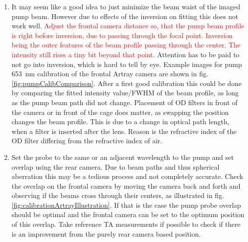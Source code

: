 \documentclass[twoside,openright]{scrreprt}
\begin{document}
\begin{enumerate}
\item It may seem like a good idea to just minimize the beam waist of the imaged pump beam. However due to effects of the inversion on fitting this does not work well. \textcolor{red}{Adjust the frontal camera distance so, that the pump beam profile is right before inversion, due to passing through the focal point. Inversion being the outer features of the beam profile passing through the center. The intensity still rises a tiny bit beyond that point.} Attention has to be paid to not go into inversion, which is hard to tell by eye. Example images for pump \qty{653}{\nano\meter} calibration of the frontal Artray camera are shown in fig. \ref{fig:pumpCalibComparison}. After a first good calibration this could be done by comparing the fitted intensity value/FWHM of the beam profile, as long as the pump beam path did not change. Placement of OD filters in front of the camera or in front of the cage does matter, as swapping the position changes the beam profile. This is due to a change in optical path length, when a filter is inserted after the lens. Reason is the refractive index of the OD filter differing from the refractive index of air.
\item Set the probe to the same or an adjacent wavelength to the pump and set overlap using the rear camera. Due to beam paths and thus spherical aberration this may be a tedious process and not completely accurate. Check the overlap on the frontal camera by moving the camera back and forth and observing if the beams cross through their centers, as illustrated in fig. \ref{fig:calibrationArtrayIllustration}. If that is the case the pump probe overlap should be optimal and the frontal camera can be set to the optimum position of this overlap. Take reference TA measurements if possible to check if there is an improvement from the purely rear camera based position.
\end{enumerate}
\end{document}
